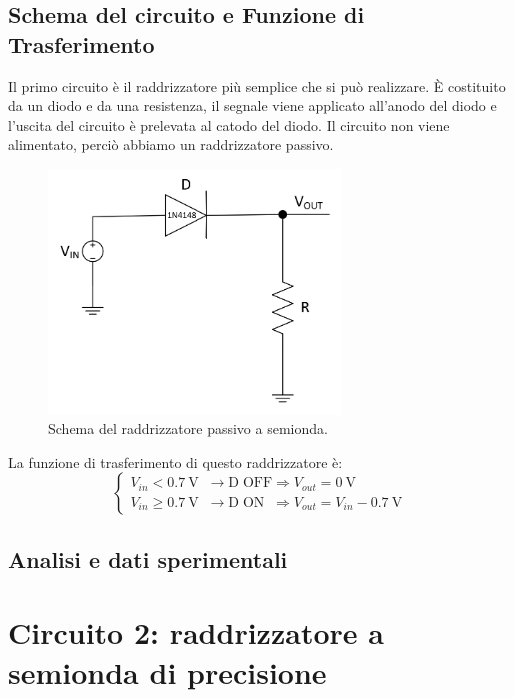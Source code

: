 \documentclass{report}
\begin{document}
\subsection{Schema del circuito e Funzione di Trasferimento}Il primo circuito è il raddrizzatore più semplice che si può realizzare. \`E costituito da un diodo e da una resistenza, il segnale viene applicato all'anodo del diodo e l'uscita del circuito è prelevata al catodo del diodo. Il circuito non viene alimentato, perciò abbiamo un raddrizzatore passivo. \par
\begin{figure}[h]
	\centering
	\includegraphics[height=6.5cm]{immagini/schema1}
	\caption{Schema del raddrizzatore passivo a semionda.}
	\label{figura:schema1}
\end{figure}
\noindent La funzione di trasferimento di questo raddrizzatore è:
\begin{equation}
   \begin{cases}
   V_{in}< \SI{0.7}{\volt}\;\;\rightarrow \mathrm{D\;OFF} \Rightarrow V_{out} =\SI{0}{\volt}\\
   V_{in}\ge \SI{0.7}{\volt}\;\;\rightarrow \mathrm{D\;ON}\;\; \Rightarrow V_{out} = V_{in}-\SI{0.7}{\volt}
   \end{cases}
\end{equation}
\subsection{Analisi e dati sperimentali}
\newpage
\section{Circuito 2: raddrizzatore a semionda di precisione}
\end{document}
